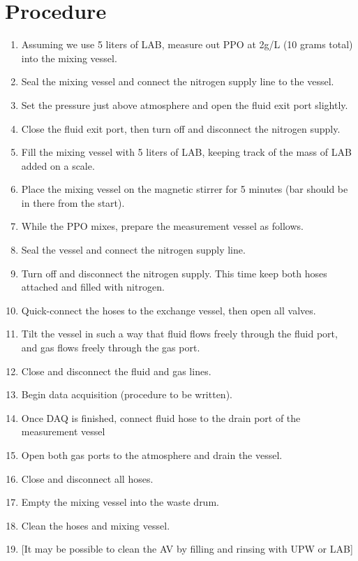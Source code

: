 \documentclass[]{article}
\begin{document}
\section{Procedure}
\begin{enumerate}
  \item Assuming we use 5 liters of LAB, measure out PPO at 2g/L (10 grams total) into the
    mixing vessel.
  \item Seal the mixing vessel and connect the nitrogen supply line to the vessel.
  \item Set the pressure just above atmosphere and open the fluid exit port slightly.
  \item Close the fluid exit port, then turn off and disconnect the nitrogen supply.
  \item Fill the mixing vessel with 5 liters of LAB, keeping track of the mass of LAB
    added on a scale.
  \item Place the mixing vessel on the magnetic stirrer for 5 minutes (bar should be in
    there from the start).
  \item While the PPO mixes, prepare the measurement vessel as follows.
  \item Seal the vessel and connect the nitrogen supply line.
  \item Turn off and disconnect the nitrogen supply. This time keep both hoses attached
    and filled with nitrogen.
  \item Quick-connect the hoses to the exchange vessel, then open all valves.
  \item Tilt the vessel in such a way that fluid flows freely through the fluid port,
    and gas flows freely through the gas port.
  \item Close and disconnect the fluid and gas lines.
  \item Begin data acquisition (procedure to be written).
  \item Once DAQ is finished, connect fluid hose to the drain port of the measurement vessel
  \item Open both gas ports to the atmosphere and drain the vessel.
  \item Close and disconnect all hoses.
  \item Empty the mixing vessel into the waste drum.
  \item Clean the hoses and mixing vessel.
  \item {[}It may be possible to clean the AV by filling and rinsing with UPW or LAB{]}
\end{enumerate}
\end{document}
